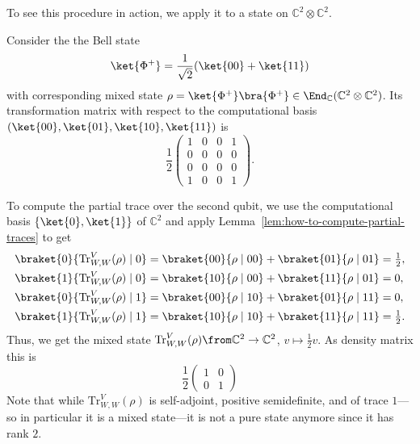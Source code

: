 \documentclass[a4paper,oneside, 12pt]{amsart}
\begin{document}
To see this procedure in action, we apply it to a  state on \( \mathbb{C}^{2}\otimes \mathbb{C}^{2}\).
\begin{example}
  Consider the the Bell state
  \begin{equation*}
    \ket{\Phi^+} = \frac{1}{\sqrt{2}}(\ket{00} + \ket{11})
  \end{equation*}
  with corresponding mixed state \(\rho = \ket{\Phi^{+}}\bra{\Phi^{+}}\in \End_{ \mathbb{C}}( \mathbb{C}^{2}\otimes \mathbb{C}^{2})\).
  Its transformation matrix with respect to the computational basis \((\ket{00}, \ket{01}, \ket{10}, \ket{11})\) is
  \begin{equation*}
    \frac{1}{2}
    \begin{pmatrix}
      1 & 0 & 0 & 1 \\
      0 & 0 & 0 & 0 \\
      0 & 0 & 0 & 0 \\
      1 & 0 & 0 & 1
    \end{pmatrix}.
  \end{equation*}

  To compute the partial trace over the second qubit, we use the computational basis \(\{\ket{0}, \ket{1}\}\) of \( \mathbb{C}^{2}\) and apply Lemma~\ref{lem:how-to-compute-partial-traces} to get
  \begin{align*}
    \braket{0}{\mathrm{Tr}^{V}_{W,W}(\rho) \mid 0}
    & = \braket{00}{\rho \mid 00} + \braket{01}{\rho \mid 01}
      = \tfrac{1}{2}, \\
    \braket{1}{\mathrm{Tr}^{V}_{W,W}(\rho) \mid 0}
    & = \braket{10}{\rho \mid 00} + \braket{11}{\rho \mid 01}
      = 0, \\
    \braket{0}{\mathrm{Tr}^{V}_{W,W}(\rho) \mid 1}
    & = \braket{00}{\rho \mid 10} + \braket{01}{\rho \mid 11}
      = 0, \\
    \braket{1}{\mathrm{Tr}^{V}_{W,W}(\rho) \mid 1}
    & = \braket{10}{\rho \mid 10} + \braket{11}{\rho \mid 11}
      = \tfrac{1}{2}.
  \end{align*}
  Thus, we get the mixed state \(\mathrm{Tr}^{V}_{W,W}(\rho) \from \mathbb{C}^{2}\to \mathbb{C}^{2}\), \(v\mapsto \tfrac{1}{2} v\).
  As density matrix this is
  \begin{equation*}
    \frac{1}{2}
    \begin{pmatrix}
      1 & 0 \\
      0 & 1
    \end{pmatrix}
  \end{equation*}
  Note that while \(\mathrm{Tr}^{V}_{W,W}(\rho)\) is self-adjoint, positive semidefinite, and of trace \(1\)---so in particular it is a mixed state---it is not a pure state anymore since it has rank \(2\).
\end{example}
\end{document}
